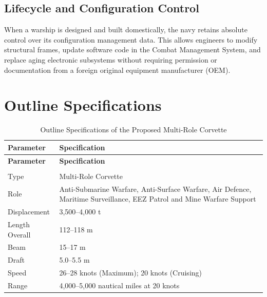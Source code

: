 \documentclass[12pt,a4paper,twoside]{report}
\begin{document}
\subsection{Lifecycle and Configuration Control}
When a warship is designed and built domestically, the navy retains 
absolute control over its configuration management data. This allows 
engineers to modify structural frames, update software code in the 
Combat Management System, and replace aging electronic subsystems 
without requiring permission or documentation from a foreign original 
equipment manufacturer (OEM).


\section{Outline Specifications}
\begin{longtable}{@{}p{}p{}@{}}
\caption{Outline Specifications of the Proposed Multi-Role Corvette}
\label{tab:outline_specifications} \\

\toprule
\textbf{Parameter} & \textbf{Specification} \\
\midrule
\endfirsthead

\toprule
\textbf{Parameter} & \textbf{Specification} \\
\midrule
\endhead

\bottomrule
\endfoot

\multicolumn{2}{@{}l}{\textbf{General Characteristics}} \\
\midrule

Type &
Multi-Role Corvette \\

Role &
Anti-Submarine Warfare, Anti-Surface Warfare, Air Defence,
Maritime Surveillance, EEZ Patrol and Mine Warfare Support \\

Displacement &
3,500--4,000 t \\

Length Overall &
112--118 m \\

Beam &
15--17 m \\

Draft &
5.0--5.5 m \\

Speed &
26--28 knots (Maximum); 20 knots (Cruising) \\

Range &
4,000--5,000 nautical miles at 20 knots \\


\end{longtable}
\end{document}
